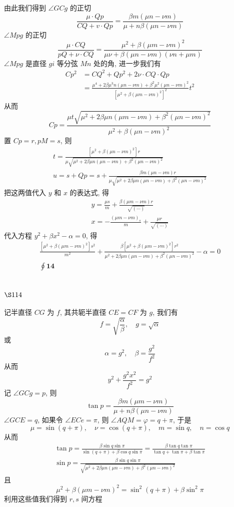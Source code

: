 由此我们得到 $\angle G C g$ 的正切
\[
\frac{\mu \cdot Q p}{C Q+v \cdot Q p}=\frac{\beta m(\mu n-\nu m)}{\mu+n \beta(\mu n-\nu m)}
\]
$\angle M p g$ 的正切
\[
\frac{\mu \cdot C Q}{p Q+\nu \cdot C Q}=\frac{\mu^{2}+\beta(\mu m-\nu m)^{2}}{\mu \nu+\beta(\mu n-\nu m)(\nu n+\mu m)}
\]
$\angle M p g$ 是直径 $g i$ 等分弦 $M n$ 处的角, 进一步我们有
\[
\begin{aligned}
C p^{2} & =C Q^{2}+Q p^{2}+2 \nu \cdot C Q \cdot Q p \\
& =\frac{\mu^{4}+2 \beta \mu^{3} n(\mu n-\nu m)+\beta^{2} \mu^{2}(\mu n-\nu m)^{2}}{\left[\mu^{2}+\beta(\mu m-\nu m)^{2}\right]^{2}} t^{2}
\end{aligned}
\]
从而
\[
C p=\frac{\mu t \sqrt{\mu^{2}+2 \beta \mu n(\mu m-\nu m)+\beta^{2}(\mu n-\nu m)^{2}}}{\mu^{2}+\beta(\mu n-\nu m)^{2}}
\]
置 $C p=r, p M=s$, 则
\[
\begin{gathered}
t=\frac{\left[\mu^{2}+\beta(\mu n-\nu m)^{2}\right] r}{\mu \sqrt{\mu^{2}+2 \beta \mu n(\mu n-\nu m)+\beta^{2}(\mu n-\nu m)^{2}}} \\
u=s+Q p=s+\frac{\beta m(\mu n-\nu m) r}{\mu \sqrt{\mu^{2}+2 \beta \mu n(\mu n-\nu m)+\beta^{2}(\mu n-\nu m)^{2}}}
\end{gathered}
\]
把这两值代入 $y$ 和 $x$ 的表达式, 得
\[
\begin{gathered}
y=\frac{\mu s}{m}+\frac{\beta(\mu m-\nu m) r}{\sqrt{(\cdots)}} \\
x=-\frac{(\mu m-\nu m)_{s}}{m}+\frac{\mu r}{\sqrt{(\cdots)}}
\end{gathered}
\]
代入方程 $y^{2}+\beta x^{2}-\alpha=0$, 得
\[
\begin{gathered}
\frac{\left[\mu^{2}+\beta(\mu m-\nu m)^{2}\right] s^{2}}{m^{2}}+\frac{\beta\left[\mu^{2}+\beta(\mu m-\nu m)^{2}\right] r^{2}}{\mu^{2}+2 \beta \mu n(\mu n-\nu m)+\beta^{2}(\mu n-\nu m)^{2}}-\alpha=0 \\
\oint \mathbf{1} \mathbf{4}
\end{gathered}
\]
\section{$\S 114$}

记半直径 $C G$ 为 $f$, 其共轭半直径 $C E=C F$ 为 $g$, 我们有
\[
f=\sqrt{\frac{\alpha}{\beta}}, \quad g=\sqrt{\alpha}
\]
或
\[
\alpha=g^{2}, \quad \beta=\frac{g^{2}}{f^{2}}
\]
从而
\[
y^{2}+\frac{g^{2} x^{2}}{f^{2}}=g^{2}
\]
记 $\angle G C g=p$, 则
\[
\tan p=\frac{\beta m(\mu m-\nu m)}{\mu+n \beta(\mu n-\nu m)}
\]
$\angle G C E=q$, 如果令 $\angle E C e=\pi$, 则 $\angle A Q M=\varphi=q+\pi$, 于是
\[
\mu=\sin (q+\pi), \quad \nu=\cos (q+\pi), \quad m=\sin q, \quad n=\cos q
\]
从而
\[
\begin{gathered}
\tan p=\frac{\beta \sin q \sin \pi}{\sin (q+\pi)+\beta \cos q \sin \pi}=\frac{\beta \tan q \tan \pi}{\tan q+\tan \pi+\beta \tan \pi} \\
\sin p=\frac{\beta \sin q \sin \pi}{\sqrt{\mu^{2}+2 \beta \mu n(\mu n-\nu m)+\beta^{2}(\mu n-\nu m)^{2}}}
\end{gathered}
\]
且
\[
\mu^{2}+\beta(\mu m-\nu m)^{2}=\sin ^{2}(q+\pi)+\beta \sin ^{2} \pi
\]
利用这些值我们得到 $r, s$ 间方程 

